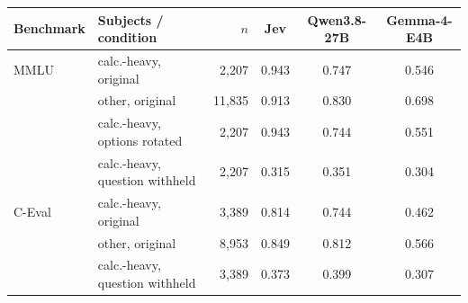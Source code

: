 \begin{tabular}{l l r c c c }
    \toprule
    Benchmark & Subjects / condition & $n$ & Jev & Qwen3.8-27B & Gemma-4-E4B \\
    \midrule
    MMLU & calc.-heavy, original & 2{,}207 & 0.943 & 0.747 & 0.546 \\
     & other, original & 11{,}835 & 0.913 & 0.830 & 0.698 \\
     & calc.-heavy, options rotated & 2{,}207 & 0.943 & 0.744 & 0.551 \\
     & calc.-heavy, question withheld & 2{,}207 & 0.315 & 0.351 & 0.304 \\
    \rowcolor{gray!10}C-Eval & calc.-heavy, original & 3{,}389 & 0.814 & 0.744 & 0.462 \\
    \rowcolor{gray!10} & other, original & 8{,}953 & 0.849 & 0.812 & 0.566 \\
    \rowcolor{gray!10} & calc.-heavy, question withheld & 3{,}389 & 0.373 & 0.399 & 0.307 \\
    \bottomrule
\end{tabular}
